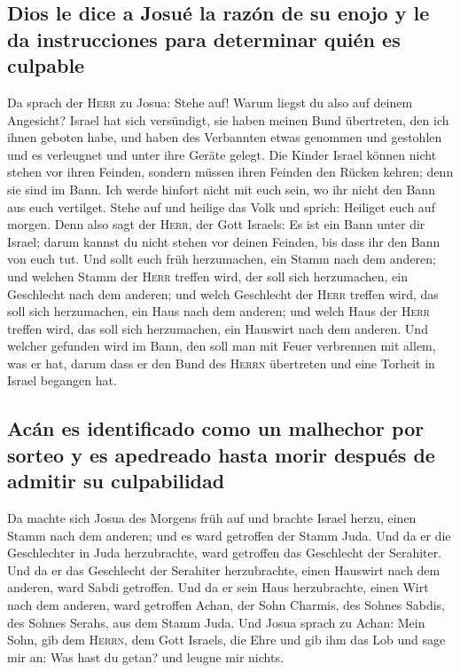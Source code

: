 \hypertarget{dios-le-dice-a-josuuxe9-la-razuxf3n-de-su-enojo-y-le-da-instrucciones-para-determinar-quiuxe9n-es-culpable}{%
\subsection{Dios le dice a Josué la razón de su enojo y le da
instrucciones para determinar quién es
culpable}\label{dios-le-dice-a-josuuxe9-la-razuxf3n-de-su-enojo-y-le-da-instrucciones-para-determinar-quiuxe9n-es-culpable}}

 Da sprach der \textsc{Herr} zu Josua: Stehe auf! Warum
liegst du also auf deinem Angesicht?  Israel hat sich
versündigt, sie haben meinen Bund übertreten, den ich ihnen geboten
habe, und haben des Verbannten etwas genommen und gestohlen und es
verleugnet und unter ihre Geräte gelegt.  Die Kinder
Israel können nicht stehen vor ihren Feinden, sondern müssen ihren
Feinden den Rücken kehren; denn sie sind im Bann. Ich werde hinfort
nicht mit euch sein, wo ihr nicht den Bann aus euch vertilget.
 Stehe auf und heilige das Volk und sprich: Heiliget euch
auf morgen. Denn also sagt der \textsc{Herr}, der Gott Israels: Es ist
ein Bann unter dir Israel; darum kannst du nicht stehen vor deinen
Feinden, bis dass ihr den Bann von euch tut.  Und sollt
euch früh herzumachen, ein Stamm nach dem anderen; und welchen Stamm der
\textsc{Herr} treffen wird, der soll sich herzumachen, ein Geschlecht
nach dem anderen; und welch Geschlecht der \textsc{Herr} treffen wird,
das soll sich herzumachen, ein Haus nach dem anderen; und welch Haus der
\textsc{Herr} treffen wird, das soll sich herzumachen, ein Hauswirt nach
dem anderen.  Und welcher gefunden wird im Bann, den soll
man mit Feuer verbrennen mit allem, was er hat, darum dass er den Bund
des \textsc{Herrn} übertreten und eine Torheit in Israel begangen hat.

\hypertarget{acuxe1n-es-identificado-como-un-malhechor-por-sorteo-y-es-apedreado-hasta-morir-despuuxe9s-de-admitir-su-culpabilidad}{%
\subsection{Acán es identificado como un malhechor por sorteo y es
apedreado hasta morir después de admitir su
culpabilidad}\label{acuxe1n-es-identificado-como-un-malhechor-por-sorteo-y-es-apedreado-hasta-morir-despuuxe9s-de-admitir-su-culpabilidad}}

 Da machte sich Josua des Morgens früh auf und brachte
Israel herzu, einen Stamm nach dem anderen; und es ward getroffen der
Stamm Juda.  Und da er die Geschlechter in Juda
herzubrachte, ward getroffen das Geschlecht der Serahiter. Und da er das
Geschlecht der Serahiter herzubrachte, einen Hauswirt nach dem anderen,
ward Sabdi getroffen.  Und da er sein Haus herzubrachte,
einen Wirt nach dem anderen, ward getroffen Achan, der Sohn Charmis, des
Sohnes Sabdis, des Sohnes Serahs, aus dem Stamm Juda. 
Und Josua sprach zu Achan: Mein Sohn, gib dem \textsc{Herrn}, dem Gott
Israels, die Ehre und gib ihm das Lob und sage mir an: Was hast du
getan? und leugne mir nichts.

